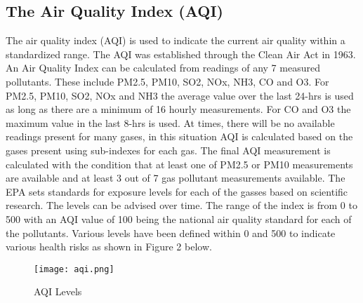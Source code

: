 \subsection{The Air Quality Index (AQI)}
The air quality index (AQI) is used to indicate the current air quality within a standardized range. The AQI was established through the Clean Air Act in 1963. An Air Quality Index can be calculated from readings of any 7 measured pollutants. These include PM2.5, PM10, SO2, NOx, NH3, CO and O3. For PM2.5, PM10, SO2, NOx and NH3 the average value over the last 24-hrs is used as long as there are a minimum of 16 hourly measurements. For CO and O3 the maximum value in the last 8-hrs is used. At times, there will be no available readings present for many gases, in this situation AQI is calculated based on the gases present using sub-indexes for each gas. The final AQI measurement is calculated with the condition that at least one of PM2.5 or PM10 measurements are available and at least 3 out of 7 gas pollutant measurements available. The EPA sets standards for exposure levels for each of the gasses based on scientific research. The levels can be advised over time. The range of the index is from 0 to 500 with an AQI value of 100 being the national air quality standard for each of the pollutants. Various levels have been defined within 0 and 500 to indicate various health risks as shown in Figure 2 below. 

\begin{figure}[h]
\centering
\texttt{[image: aqi.png]}
\caption{AQI Levels}
\label{fig:aqiLevels}
\end{figure}


